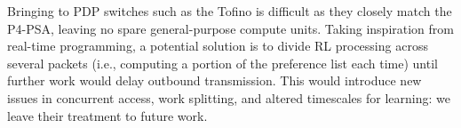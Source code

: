 Bringing \approachshort{} to PDP switches such as the Tofino is difficult as they closely match the P4-PSA, leaving no spare general-purpose compute units.
Taking inspiration from real-time programming, a potential solution is to divide RL processing across several packets (i.e., computing a portion of the preference list each time) until further work would delay outbound transmission.
This would introduce new issues in concurrent access, work splitting, and altered timescales for learning: we leave their treatment to future work.

%
